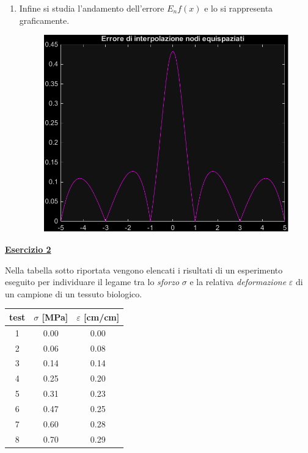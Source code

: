 \begin{enumerate}
	\item Infine si studia l'andamento dell'errore $E_{n}f\left(x\right)$ e lo si rappresenta graficamente.
	
	\begin{figure}[!htp]
		\centering
		\includegraphics[width=.7\textwidth]{img/interpolazione-2.pdf}
	\end{figure}
\end{enumerate}

\newpage

\begin{flushleft}
	\textbf{\underline{Esercizio 2}}
\end{flushleft}
Nella tabella sotto riportata vengono elencati i risultati di un esperimento eseguito per individuare il legame tra lo \emph{sforzo} $\sigma$ e la relativa \emph{deformazione} $\varepsilon$ di un campione di un tessuto biologico.
\begin{table}[!htp]
	\centering
	\begin{tabular}{@{} c c c @{}}
		\toprule
		test & $\sigma$ [MPa] & $\varepsilon$ [cm/cm] \\
		\midrule
		1 & 0.00 & 0.00 \\
		2 & 0.06 & 0.08 \\
		3 & 0.14 & 0.14 \\
		4 & 0.25 & 0.20 \\
		5 & 0.31 & 0.23 \\
		6 & 0.47 & 0.25 \\
		7 & 0.60 & 0.28 \\
		8 & 0.70 & 0.29 \\
		\bottomrule
	\end{tabular}
\end{table}

